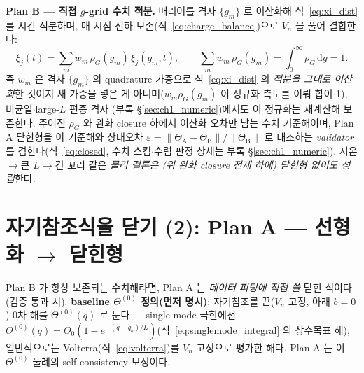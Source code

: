 \documentclass[11pt,a4paper]{article}
\newcommand{\dd}{\mathrm{d}}
\begin{document}
\textbf{Plan B — 직접 $g$-grid 수치 적분.} 배리어를 격자 $\{g_m\}$ 로 이산화해
식~\eqref{eq:xi_dist} 를 시간 적분하며, 매 시점 전하 보존(식~\eqref{eq:charge_balance})으로 $V_n$ 을 풀어 결합한다:
\begin{equation*}
\xi_j(t)=\sum_m w_m\,\rho_G(g_m)\,\xi_j(g_m,t),\qquad \sum_m w_m\,\rho_G(g_m)=\int_0^\infty\rho_G\,\dd g=1.
\end{equation*}
즉 $w_m$ 은 격자 $\{g_m\}$ 의 quadrature 가중으로 식~\eqref{eq:xi_dist} 의 \emph{적분을 그대로 이산화}한 것이지
새 가중을 넣은 게 아니며($w_m\rho_G(g_m)$ 이 정규화 측도를 이뤄 합이 1), 비균일$\cdot$large-$L$ 편중 격자
(부록 \S\ref{sec:ch1_numeric})에서도 이 정규화는 재계산해 보존한다. 주어진 $\rho_G$ 와 완화 closure 하에서
이산화 오차만 남는 수치 기준해이며, Plan A 닫힌형을 이 기준해와 상대오차
$\varepsilon=\lVert\Theta_\mathrm A-\Theta_\mathrm B\rVert/\lVert\Theta_\mathrm B\rVert$ 로 대조하는 \emph{validator}
를 겸한다(식~\eqref{eq:closed}, 수치 스킴$\cdot$수렴 판정 상세는 부록 \S\ref{sec:ch1_numeric}). 저온$\to$큰
$L\to$긴 꼬리 같은 \emph{물리 결론은 (위 완화 closure 전제 하에) 닫힌형 없이도 성립}한다.

\section{자기참조식을 닫기 (2): Plan A — 선형화 $\to$ 닫힌형}\label{sec:planA}
Plan B 가 항상 보존되는 수치해라면, Plan A 는 \emph{데이터 피팅에 직접 쓸} 닫힌 식이다(검증 통과 시). \textbf{baseline
$\Theta^{(0)}$ 정의(먼저 명시)}: 자기참조를 끈($V_n$ 고정, 아래 $b=0$) 0차 해를 $\Theta^{(0)}(q)$ 로 둔다 —
single-mode 극한에선 $\Theta^{(0)}(q)=\Theta_0(1-e^{-(q-q_a)/L})$(식~\eqref{eq:singlemode_integral} 의 상수목표
해), 일반적으로는 Volterra(식~\eqref{eq:volterra})를 $V_n$-고정으로 평가한 해다. Plan A 는 이 $\Theta^{(0)}$ 둘레의
self-consistency 보정이다.
\end{document}
